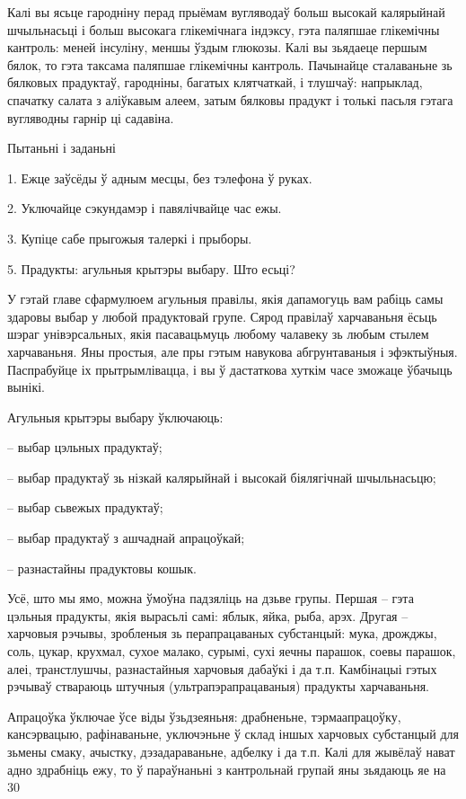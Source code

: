 Калі вы ясьце гародніну перад прыёмам вугляводаў больш высокай калярыйнай шчыльнасьці і больш высокага глікемічнага індэксу, гэта паляпшае глікемічны кантроль: меней інсуліну, меншы ўздым глюкозы. Калі вы зьядаеце першым бялок, то гэта таксама паляпшае глікемічны кантроль. Пачынайце сталаваньне зь бялковых прадуктаў, гародніны, багатых клятчаткай, і тлушчаў: напрыклад, спачатку салата з аліўкавым алеем, затым бялковы прадукт і толькі пасьля гэтага вугляводны гарнір ці садавіна.

Пытаньні і заданьні

1. Ежце заўсёды ў адным месцы, без тэлефона ў руках.

2. Уключайце сэкундамэр і павялічвайце час ежы.

3. Купіце сабе прыгожыя талеркі і прыборы.


5. Прадукты: агульныя крытэры выбару. Што есьці?

У гэтай главе сфармулюем агульныя правілы, якія дапамогуць вам рабіць самы здаровы выбар у любой прадуктовай групе. Сярод правілаў харчаваньня ёсьць шэраг унівэрсальных, якія пасавацьмуць любому чалавеку зь любым стылем харчаваньня. Яны простыя, але пры гэтым навукова абгрунтаваныя і эфэктыўныя. Паспрабуйце іх прытрымлівацца, і вы ў дастаткова хуткім часе зможаце ўбачыць вынікі.

Агульныя крытэры выбару ўключаюць: 

– выбар цэльных прадуктаў;

– выбар прадуктаў зь нізкай калярыйнай і высокай біялягічнай шчыльнасьцю;

– выбар сьвежых прадуктаў;

– выбар прадуктаў з ашчаднай апрацоўкай;

– разнастайны прадуктовы кошык.

Усё, што мы ямо, можна ўмоўна падзяліць на дзьве групы. Першая – гэта цэльныя прадукты, якія вырасьлі самі: яблык, яйка, рыба, арэх. Другая – харчовыя рэчывы, зробленыя зь перапрацаваных субстанцый: мука, дрожджы, соль, цукар, крухмал, сухое малако, сурымі, сухі яечны парашок, соевы парашок, алеі, транстлушчы, разнастайныя харчовыя дабаўкі і да т.п. Камбінацыі гэтых рэчываў ствараюць штучныя (ультрапэрапрацаваныя) прадукты харчаваньня.

Апрацоўка ўключае ўсе віды ўзьдзеяньня: драбненьне, тэрмаапрацоўку, кансэрвацыю, рафінаваньне, уключэньне ў склад іншых харчовых субстанцый для зьмены смаку, ачыстку, дэзадараваньне, адбелку і да т.п. Калі для жывёлаў нават адно здрабніць ежу, то ў параўнаньні з кантрольнай групай яны зьядаюць яе на 30%

